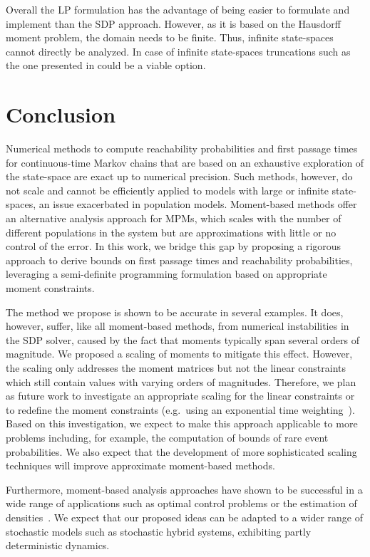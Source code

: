 Overall the \ac{LP} formulation has the advantage of being easier to formulate and implement than the \ac{SDP} approach.
However, as it is based on the Hausdorff moment problem, the domain needs to be finite.
Thus, infinite state-spaces cannot directly be analyzed.
In case of infinite state-spaces truncations such as the one presented in \textcite{kim2020slack} could be a viable option.


\section{Conclusion}\label{sec:mfpt:conclusion}
Numerical methods to compute reachability probabilities and first passage times
for continuous-time Markov chains that are based on an exhaustive exploration of the state-space
are exact up to numerical precision. Such methods, however, do not scale and cannot be efficiently applied to models with large or infinite state-spaces,
an issue exacerbated in population models. Moment-based methods offer an alternative analysis approach
for \acp{MPM}, which scales with the number of different populations in the system
but are approximations with little or no control of the error.
In this work,
we bridge this gap by proposing a rigorous approach to derive bounds on first passage
times and reachability probabilities, leveraging a semi-definite programming formulation
based on appropriate moment constraints. 

The method we propose is shown to be accurate in several examples. It does, however, suffer, like all moment-based methods, from numerical instabilities in the \ac{SDP} solver, caused by the fact that moments typically span several orders of magnitude. We proposed a scaling of moments to mitigate this effect. 
However, the scaling only addresses the moment matrices but not the linear constraints
which still contain values with varying orders of magnitudes.
Therefore, we plan as future work to investigate an appropriate scaling for the linear constraints
or to redefine the moment
constraints (e.g.\ using an exponential time weighting~\parencite{dowdy2018dynamic}).
Based on this investigation, we expect to make this approach applicable to
more problems including, for example, the computation of bounds of rare event probabilities.
We also expect that the development of more sophisticated scaling techniques will  improve approximate moment-based methods.

Furthermore, moment-based analysis approaches have shown to be successful
in a wide range of applications such as optimal control problems or the estimation
of densities~\parencite{lasserre2010moments}.
We expect that our proposed ideas   can be adapted to a wider range
of stochastic models such as stochastic hybrid systems, exhibiting partly deterministic dynamics.
